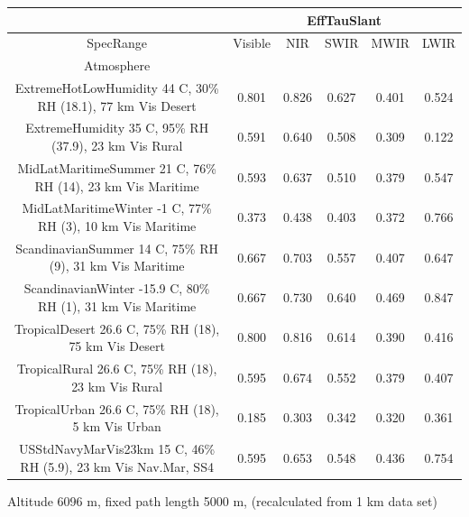 \documentclass{workpackage}
\begin{document}
\begin{center}

\begin{footnotesize}

\begin{tabular}{|c|c|c|c|c|c|}
\hline
&\multicolumn{5}{|c|}{EffTauSlant}\\\hline
SpecRange&Visible&NIR&SWIR&MWIR&LWIR\\\hline
Atmosphere&&&&&\\\hline
ExtremeHotLowHumidity 44 C, 30\% RH (18.1), 77 km Vis Desert&0.801&0.826&0.627&0.401&0.524\\\hline
ExtremeHumidity 35 C, 95\% RH (37.9), 23 km Vis Rural&0.591&0.640&0.508&0.309&0.122\\\hline
MidLatMaritimeSummer 21 C, 76\% RH (14), 23 km Vis Maritime&0.593&0.637&0.510&0.379&0.547\\\hline
MidLatMaritimeWinter -1 C, 77\% RH (3), 10 km Vis Maritime&0.373&0.438&0.403&0.372&0.766\\\hline
ScandinavianSummer 14 C, 75\% RH (9), 31 km Vis Maritime&0.667&0.703&0.557&0.407&0.647\\\hline
ScandinavianWinter -15.9 C, 80\% RH (1), 31 km Vis Maritime&0.667&0.730&0.640&0.469&0.847\\\hline
TropicalDesert 26.6 C, 75\% RH (18), 75 km Vis Desert&0.800&0.816&0.614&0.390&0.416\\\hline
TropicalRural 26.6 C, 75\% RH (18), 23 km Vis Rural&0.595&0.674&0.552&0.379&0.407\\\hline
TropicalUrban 26.6 C, 75\% RH (18), 5 km Vis Urban&0.185&0.303&0.342&0.320&0.361\\\hline
USStdNavyMarVis23km 15 C, 46\% RH (5.9), 23 km Vis Nav.Mar, SS4&0.595&0.653&0.548&0.436&0.754\\\hline

\end{tabular}
\end{footnotesize}
\end{center}

Altitude 6096 m, fixed path length 5000 m, (recalculated from 1 km data set)
\end{document}
